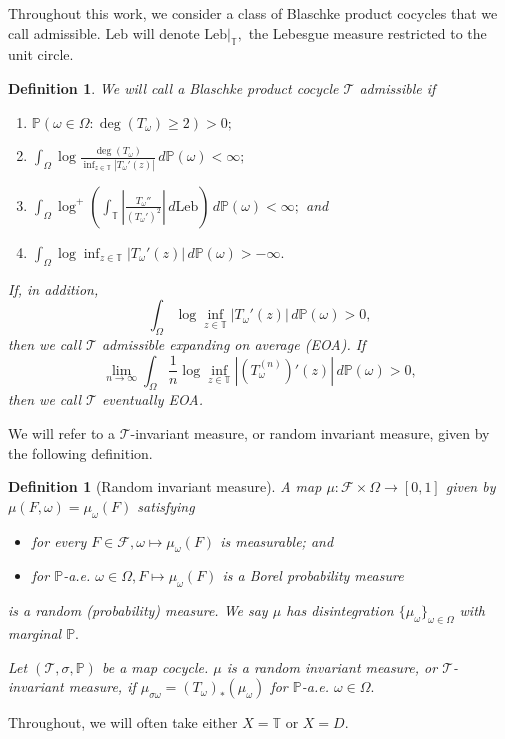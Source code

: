\documentclass[12pt,reqno]{amsart}
\numberwithin{theorem}{section}
\newtheorem{definition}[theorem]{Definition}%
\begin{document}
Throughout this work, we consider a class of Blaschke product cocycles that we call admissible. $\text{Leb}$ will denote $\text{Leb}|_{\mathbb{T}},$ the Lebesgue measure restricted to the unit circle.
\begin{definition}\label{admissible}
    We will call a Blaschke product cocycle $\mathcal{T}$ \textit{admissible} if \begin{enumerate}
    \item $\mathbb{P}(\omega\in\Omega:\deg(T_{\omega})\ge2)>0;$
    \item $\int_{\Omega}\log\frac{\deg(T_{\omega})}{\inf_{z\in\mathbb{T}}|T_{\omega}'(z)|}\,d\mathbb{P}(\omega)<\infty;$
    \item $\int_{\Omega}\log^{+}\left(\int_{\mathbb{T}}\left|\frac{T_{\omega}''}{(T_{\omega}')^2}\right|\,d\text{Leb}\right)\,d\mathbb{P}(\omega)<\infty;$ and
    \item $\int_{\Omega}\log\inf_{z\in\mathbb{T}}|T_{\omega}'(z)|\,d\mathbb{P}(\omega)>-\infty.$
    \end{enumerate} If, in addition, $$\int_{\Omega}\log\inf_{z\in\mathbb{T}}|T_{\omega}'(z)|\,d\mathbb{P}(\omega)>0,$$ then we call $\mathcal{T}$ admissible expanding on average (EOA). If $$\lim_{n\to\infty}\int_{\Omega}\frac{1}{n}\log\inf_{z\in\mathbb{T}}|(T_{\omega}^{(n)})'(z)|\,d\mathbb{P}(\omega)>0,$$ then we call $\mathcal{T}$ eventually EOA.
\end{definition}

We will refer to a $\mathcal{T}$-invariant measure, or random invariant measure,  given by the following definition.
\begin{definition}[Random invariant measure]
A map $\mu:\mathcal{F}\times\Omega\to[0,1]$ given by $\mu(F,\omega)=\mu_{\omega}(F)$ satisfying \begin{itemize}
    \item for every $F\in\mathcal{F}, \omega\mapsto\mu_{\omega}(F)$ is measurable; and
    \item for $\mathbb{P}$-a.e. $\omega\in\Omega, F\mapsto\mu_{\omega}(F)$ is a Borel probability measure
\end{itemize} is a random (probability) measure. We say $\mu$ has disintegration $\{\mu_{\omega}\}_{\omega\in\Omega}$ with marginal $\mathbb{P}.$

 Let $(\mathcal{T}, \sigma, \mathbb{P})$ be a map cocycle. $\mu$ is a random invariant measure, or $\mathcal{T}$-invariant measure, if  $\mu_{\sigma\omega}=(T_{\omega})_{*}(\mu_{\omega})$ for $\mathbb{P}$-a.e. $\omega\in\Omega.$
\end{definition}
Throughout, we will often take either $X=\mathbb{T}$ or $X=D.$
\end{document}
